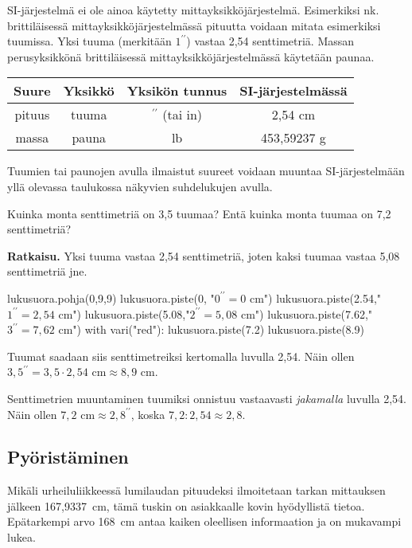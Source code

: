 SI-järjestelmä ei ole ainoa käytetty mittayksikköjärjestelmä. Esimerkiksi nk. brittiläisessä mittayksikköjärjestelmässä pituutta voidaan mitata esimerkiksi tuumissa. Yksi tuuma (merkitään $1^{\prime \prime}$) vastaa 2,54 senttimetriä. Massan perusyksikkönä brittiläisessä mittayksikköjärjestelmässä käytetään paunaa.

\begin{tabular}{c|c|c|c}
Suure & Yksikkö & Yksikön tunnus & SI-järjestelmässä\\
\hline
pituus & tuuma & $^{\prime \prime}$ (tai in) & 2,54 cm \\
massa & pauna & lb & 453,59237 g \\
\end{tabular}

Tuumien tai paunojen avulla ilmaistut suureet voidaan muuntaa SI-järjestelmään yllä olevassa taulukossa näkyvien suhdelukujen avulla.

\begin{esimerkki}
Kuinka monta senttimetriä on 3,5 tuumaa? Entä kuinka monta tuumaa on 7,2 senttimetriä?

\textbf{Ratkaisu. } Yksi tuuma vastaa 2,54 senttimetriä, joten kaksi tuumaa vastaa 5,08 senttimetriä jne.

\begin{kuva}
	lukusuora.pohja(0,9,9)
	lukusuora.piste(0, "$0^{\prime \prime} = 0 $ cm")
	lukusuora.piste(2.54,"$1^{\prime \prime} = 2,54$ cm")
	lukusuora.piste(5.08,"$2^{\prime \prime} = 5,08$ cm")
	lukusuora.piste(7.62,"$3^{\prime \prime} = 7,62$ cm")
	with vari("red"):
	  lukusuora.piste(7.2)
	  lukusuora.piste(8.9)
\end{kuva}

Tuumat saadaan siis senttimetreiksi kertomalla luvulla 2,54. Näin ollen $3,5^{\prime \prime} = 3,5 \cdot 2,54 \textrm{ cm} \approx 8,9 \textrm{ cm}$.

Senttimetrien muuntaminen tuumiksi onnistuu vastaavasti \emph{jakamalla} luvulla 2,54. Näin ollen $7,2 \textrm{ cm} \approx 2,8^{\prime \prime}$, koska $7,2 : 2,54 \approx 2,8$.

\end{esimerkki}

\subsection*{Pyöristäminen}

Mikäli urheiluliikkeessä lumilaudan pituudeksi ilmoitetaan tarkan mittauksen jälkeen 167,9337~cm, tämä tuskin on asiakkaalle kovin hyödyllistä tietoa. Epätarkempi arvo 168~cm antaa kaiken oleellisen informaation ja on mukavampi lukea.


